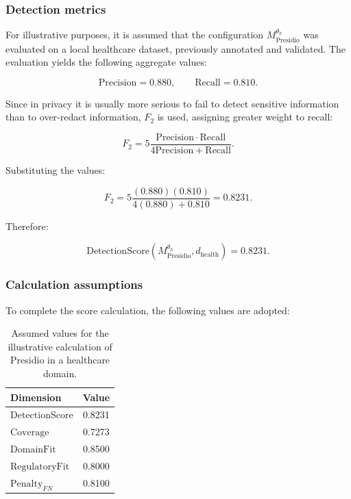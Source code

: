 \documentclass[11pt,a4paper]{article}
\begin{document}
\subsubsection{Detection metrics}

For illustrative purposes, it is assumed that the configuration \(M_{\mathrm{Presidio}}^{\theta_h}\) was evaluated on a local healthcare dataset, previously annotated and validated. The evaluation yields the following aggregate values:

\begin{equation}
\mathrm{Precision}=0.880,
\qquad
\mathrm{Recall}=0.810.
\end{equation}

Since in privacy it is usually more serious to fail to detect sensitive information than to over-redact information, \(F_2\) is used, assigning greater weight to recall:

\begin{equation}
F_2 =
5
\frac{
\mathrm{Precision}\cdot\mathrm{Recall}
}{
4\mathrm{Precision}+\mathrm{Recall}
}.
\end{equation}

Substituting the values:

\begin{equation}
F_2 =
5
\frac{
(0.880)(0.810)
}{
4(0.880)+0.810
}
=
0.8231.
\end{equation}

Therefore:

\begin{equation}
\mathrm{DetectionScore}
\left(
M_{\mathrm{Presidio}}^{\theta_h},
d_{\mathrm{health}}
\right)
=
0.8231.
\end{equation}

\subsubsection{Calculation assumptions}

To complete the score calculation, the following values are adopted:

\begin{table}[h!]
\centering
\caption{Assumed values for the illustrative calculation of Presidio in a healthcare domain.}
\label{tab:presidio_health_example}
\begin{tabular}{lc}
\toprule
\textbf{Dimension} & \textbf{Value} \\
\midrule
\(\mathrm{DetectionScore}\) & 0.8231 \\
\(\mathrm{Coverage}\) & 0.7273 \\
\(\mathrm{DomainFit}\) & 0.8500 \\
\(\mathrm{RegulatoryFit}\) & 0.8000 \\
\(\mathrm{Penalty}_{FN}\) & 0.8100 \\
\bottomrule
\end{tabular}
\end{table}
\end{document}
